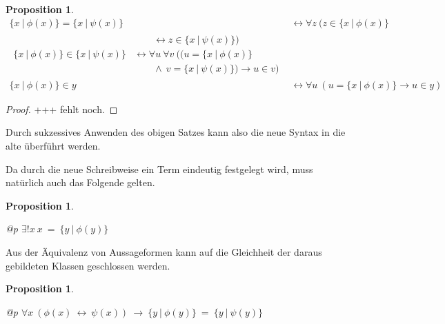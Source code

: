 \documentclass[a4paper,german,10pt,twoside]{book}
\newtheorem{prop}[thm]{Proposition}
\theoremstyle{definition}
\theoremstyle{remark}
\begin{document}
\begin{prop}
\begin{align}
\{ x~|~\phi(x) \} = \{ x~|~\psi(x) \} & \leftrightarrow \forall z \ (z \in \{ x~|~\phi(x) \} \tag{c} \\
\begin{split}
  & \qquad \leftrightarrow z \in \{x~|~\psi(x) \}) \nonumber \\
\{ x~|~\phi(x) \} \in \{ x~|~\psi(x) \} & \leftrightarrow  \forall u \ \forall
v \ ((u  = \{ x~|~\phi(x) \} \\
  & \qquad \land \ v = \{ x~|~\psi(x) \}) \rightarrow u \in v) 
\end{split} \tag{d} \\
\{ x~|~\phi(x) \} \in y & \leftrightarrow  \forall u \ (u  = \{ x~|~\phi(x) \}  \rightarrow u \in y) \tag{e} 
\end{align}
\end{prop}
\begin{proof}
+++ fehlt noch.
\end{proof}

Durch sukzessives Anwenden des obigen Satzes kann also die neue Syntax in die alte {\"u}berf{\"u}hrt werden.


\par
Da durch die neue Schreibweise ein Term eindeutig festgelegt wird, muss nat{\"u}rlich auch das Folgende gelten.

\begin{prop}
\label{theorem:setDefinitionUnique} \hypertarget{theorem:setDefinitionUnique}{}
\mbox{}
\begin{longtable}{{@{\extracolsep{\fill}}p{\linewidth}}}
\centering $\exists! x\ x \ =  \ \{ y \ | \ \phi(y) \} $
\end{longtable}

\end{prop}




\par
Aus der {\"A}quivalenz von Aussageformen kann auf die Gleichheit der daraus gebildeten Klassen geschlossen werden.

\begin{prop}
\label{theorem:propositionEqualImplClassEqual} \hypertarget{theorem:propositionEqualImplClassEqual}{}
\mbox{}
\begin{longtable}{{@{\extracolsep{\fill}}p{\linewidth}}}
\centering $\forall x\ (\phi(x)\ \leftrightarrow \ \psi(x))\ \rightarrow \ \{ y \ | \ \phi(y) \}  \ =  \ \{ y \ | \ \psi(y) \} $
\end{longtable}

\end{prop}
\end{document}
